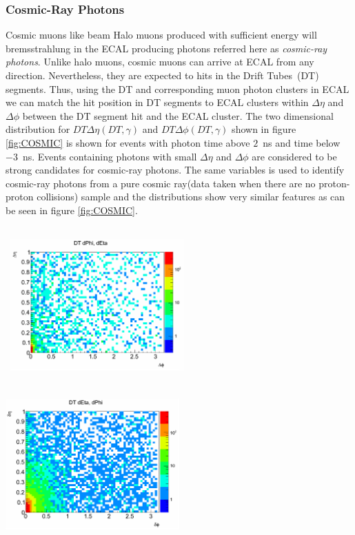 \subsubsection{Cosmic-Ray Photons}
Cosmic muons like beam Halo muons produced with sufficient energy  will bremsstrahlung in the ECAL producing photons referred here as \textit{cosmic-ray photons}. Unlike halo muons, cosmic muons can arrive at ECAL from any direction. Nevertheless, they are expected to hits in the Drift Tubes~(DT) segments. Thus, using the DT and corresponding  muon photon clusters in ECAL we can match the  hit position in DT segments to ECAL clusters within $\Delta\eta$ and $\Delta\phi$ between the DT segment hit and the ECAL cluster. The two dimensional distribution for $DT\Delta\eta(DT,\gamma)$ and $DT\Delta\phi(DT,\gamma)$ shown in figure \ref{fig:COSMIC} is shown for events with photon time above $2$~ns and time below $-3$~ns. Events containing photons with small $\Delta\eta$ and $\Delta\phi$ are considered to be strong candidates for cosmic-ray photons. The same variables is used to identify cosmic-ray photons from a pure cosmic ray(data taken when there are no proton-proton collisions) sample and the distributions show very similar features as can be seen in figure 
\ref{fig:COSMIC}.

\begin{center}
\centering
\mbox{
\includegraphics[height=6cm, width=0.5\textwidth]{THESISPLOTS/Cosmic_Ray_Photons_Data.png}
\includegraphics[height=6cm, width=0.5\textwidth]{THESISPLOTS/Cosmic_Ray_Photons_Cosmic_dataset.png} }
\label{fig:COSMIC}
\end{center}

